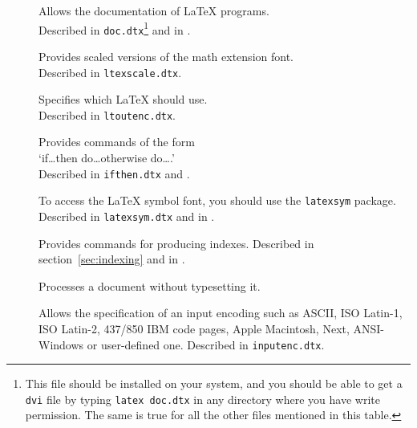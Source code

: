 \begin{table}[btp]
\caption{Some of the Packages Distributed with \LaTeX.} \label{packages}
\begin{lined}{\textwidth}
\begin{description}
\item[\normalfont{}] Allows the documentation of \LaTeX{} programs.\\
 Described in \texttt{doc.dtx}\footnote{This file should be installed
   on your system, and you should be able to get a \texttt{dvi} file
   by typing \texttt{latex doc.dtx} in any directory where you have
   write permission. The same is true for all the
   other files mentioned in this table.}  and in \companion.

\item[\normalfont{}] Provides scaled versions of the
  math extension  font.\\
  Described in \texttt{ltexscale.dtx}.

\item[\normalfont{}] Specifies which 
  \LaTeX{} should use.\\
  Described in \texttt{ltoutenc.dtx}.

\item[\normalfont{}] Provides commands of the form\\
  `if\ldots then do\ldots otherwise do\ldots.'\\ Described in
  \texttt{ifthen.dtx} and \companion.

\item[\normalfont{}] To access the \LaTeX{} symbol
  font, you should use the \texttt{latexsym} package. Described in
  \texttt{latexsym.dtx} and in \companion.

\item[\normalfont{}] Provides commands for producing
  indexes.  Described in section~\ref{sec:indexing} and in \companion.

\item[\normalfont{}] Processes a document without
  typesetting it.

\item[\normalfont{}] Allows the specification of an
  input encoding such as ASCII, ISO Latin-1, ISO Latin-2, 437/850 IBM
  code pages,  Apple Macintosh, Next, ANSI-Windows or user-defined one.
  Described in \texttt{inputenc.dtx}.
\end{description}
\end{lined}
\end{table}


